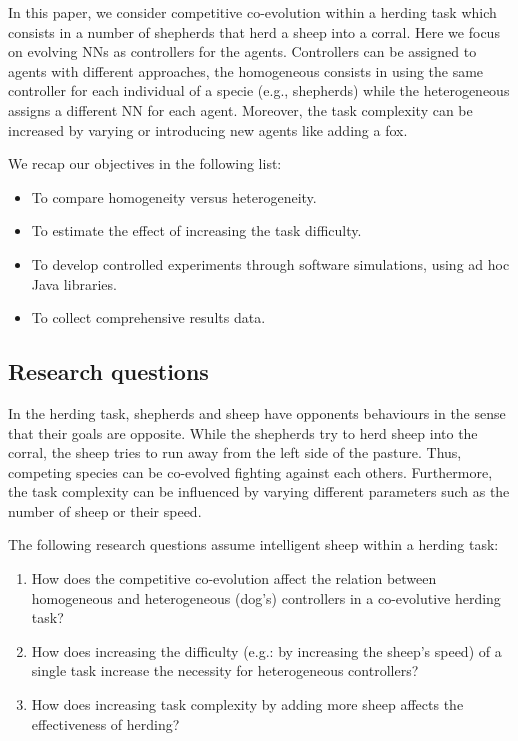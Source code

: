 \documentclass[conference]{IEEEtran}
\begin{document}
In this paper, we consider competitive co-evolution within a herding task which consists in a number of shepherds that herd a sheep into a corral.
Here we focus on evolving NNs as controllers for the agents.
Controllers can be assigned to agents with different approaches, the homogeneous consists in using the same controller for each individual of a specie (e.g., shepherds) while the heterogeneous assigns a different NN for each agent.
Moreover, the task complexity can be increased by varying or introducing new agents like adding a fox.

We recap our objectives in the following list:

\begin{itemize}
	\item To compare homogeneity versus heterogeneity.
	\item To estimate the effect of increasing the task difficulty.
 	\item To develop controlled experiments through software simulations, using ad hoc Java libraries.
	\item To collect comprehensive results data.
\end{itemize}
 
\subsection{Research questions}
In the herding task, shepherds and sheep have opponents behaviours in the sense that their goals are opposite.
While the shepherds try to herd sheep into the corral, the sheep tries to run away from the left side of the pasture.
Thus, competing species can be co-evolved fighting against each others.
Furthermore, the task complexity can be influenced by varying different parameters such as the number of sheep or their speed.

The following research questions assume intelligent sheep within a herding task:
 
\begin{enumerate}
	\item How does the competitive co-evolution affect the relation between homogeneous and heterogeneous (dog’s) controllers in a co-evolutive herding task?
	\item How does increasing the difficulty (e.g.: by increasing the sheep’s speed) of a single task increase the necessity for heterogeneous controllers?
	\item How does increasing task complexity by adding more sheep affects the effectiveness of herding?
\end{enumerate}
\end{document}
